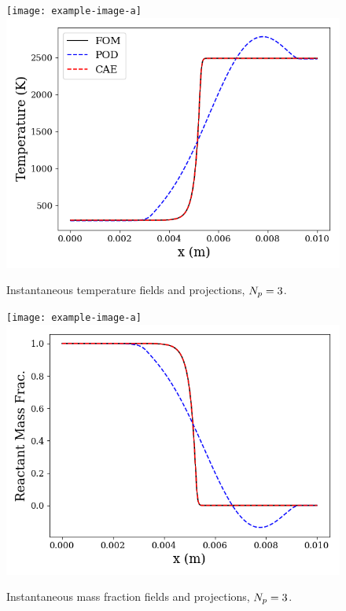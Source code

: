 \begin{figure}
    \begin{minipage}{0.45\linewidth}
        \ifdefined\DRAFT
            \texttt{[image: example-image-a]}
        \else
		    \includegraphics[width=0.99\linewidth]{Chapters/ProjROMs/Images/temp_proj_field.png}
        \fi
        \caption{\label{fig:projErrTempField}Instantaneous temperature fields and projections, $N_p = 3$.}
    \end{minipage}
    \hspace{1em}
    \begin{minipage}{0.45\linewidth}
        \ifdefined\DRAFT
            \texttt{[image: example-image-a]}
        \else
    		\includegraphics[width=0.99\linewidth]{Chapters/ProjROMs/Images/mf_proj_field.png}
        \fi
        \caption{\label{fig:projErrMFField}Instantaneous mass fraction fields and projections, $N_p = 3$.}
    \end{minipage}
\end{figure}
